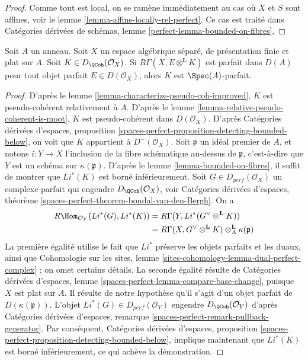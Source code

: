 \begin{proof}
Comme tout est local, on se ramène immédiatement au
cas où $X$ et $S$ sont affines, voir le lemme
\ref{lemma-affine-locally-rel-perfect}.
Ce cas est traité dans
Catégories dérivées de schémas, lemme \ref{perfect-lemma-bounded-on-fibres}.
\end{proof}

\begin{lemma}
\label{lemma-characterize-relatively-perfect}
Soit $A$ un anneau. Soit $X$ un espace algébrique séparé, de
présentation finie et plat sur $A$. Soit $K \in D_\QCoh(\mathcal{O}_X)$.
Si $R \Gamma (X, E \otimes^\mathbf{L} K)$ est parfait dans
$D(A)$ pour tout objet parfait $E \in D(\mathcal{O}_X)$, alors $K$ est
$\Spec(A)$-parfait.
\end{lemma}

\begin{proof}
D'après le lemme \ref{lemma-characterize-pseudo-coh-improved},
$K$ est pseudo-cohérent relativement à $A$. D'après le lemme
\ref{lemma-relative-pseudo-coherent-is-moot},
$K$ est pseudo-cohérent dans $D(\mathcal{O}_X)$.
D'après Catégories dérivées d'espaces, proposition
\ref{spaces-perfect-proposition-detecting-bounded-below},
on voit que $K$ appartient à $D^-(\mathcal{O}_X)$.
Soit $\mathfrak{p}$ un idéal premier de $A$, et notons
$i : Y \to X$ l'inclusion de la fibre schématique
au-dessus de $\mathfrak{p}$, c'est-à-dire que $Y$ est un schéma sur $\kappa(\mathfrak p)$.
D'après le lemme \ref{lemma-bounded-on-fibres},
il suffit de montrer que $Li^*(K)$ est borné inférieurement.
Soit $G \in D_{perf} (\mathcal{O}_X)$ un complexe
parfait qui engendre $D_\QCoh (\mathcal{O}_X)$,
voir Catégories dérivées d'espaces, théorème
\ref{spaces-perfect-theorem-bondal-van-den-Bergh}.
On a
\begin{align*}
R\Hom _{\mathcal{O}_Y}(Li^*(G), Li^*(K))
& =
R\Gamma(Y, Li^*(G ^\vee \otimes ^\mathbf{L} K)) \\
& =
R\Gamma(X, G^\vee \otimes ^{\mathbf{L}} K)
\otimes^\mathbf{L}_A \kappa(\mathfrak{p})
\end{align*}
La première égalité utilise le fait que $Li^*$ préserve les objets parfaits et les duaux,
ainsi que Cohomologie sur les sites, lemme
\ref{sites-cohomology-lemma-dual-perfect-complex} ; on omet
certains détails. La seconde égalité résulte de
Catégories dérivées d'espaces, lemme
\ref{spaces-perfect-lemma-compare-base-change},
puisque $X$ est plat sur $A$. Il résulte de notre hypothèse qu'il s'agit d'un
objet parfait de $D(\kappa(\mathfrak{p}))$. L'objet
$Li^*(G) \in D_{perf}(\mathcal{O}_Y)$ engendre $D_\QCoh(\mathcal{O}_Y)$ d'après
Catégories dérivées d'espaces, remarque
\ref{spaces-perfect-remark-pullback-generator}.
Par conséquent, Catégories dérivées d'espaces, proposition
\ref{spaces-perfect-proposition-detecting-bounded-below},
implique maintenant que $Li^*(K)$ est borné inférieurement, ce qui achève la démonstration.
\end{proof}














